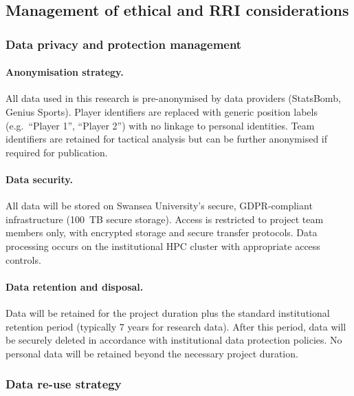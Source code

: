 \subsection{Management of ethical and RRI considerations}

\subsubsection{Data privacy and protection management}

\paragraph{Anonymisation strategy.}
All data used in this research is pre-anonymised by data providers (StatsBomb, Genius Sports). Player identifiers are replaced with generic position labels (e.g.\ ``Player 1'', ``Player 2'') with no linkage to personal identities. Team identifiers are retained for tactical analysis but can be further anonymised if required for publication.

\paragraph{Data security.}
All data will be stored on Swansea University's secure, GDPR-compliant infrastructure (100~TB secure storage). Access is restricted to project team members only, with encrypted storage and secure transfer protocols. Data processing occurs on the institutional HPC cluster with appropriate access controls.

\paragraph{Data retention and disposal.}
Data will be retained for the project duration plus the standard institutional retention period (typically 7 years for research data). After this period, data will be securely deleted in accordance with institutional data protection policies. No personal data will be retained beyond the necessary project duration.

\subsubsection{Data re-use strategy}

